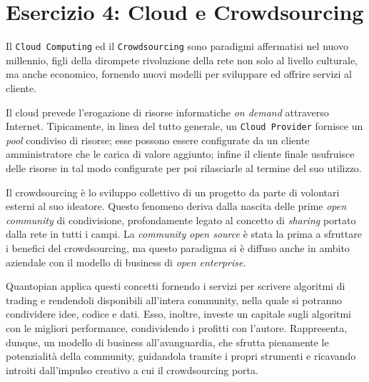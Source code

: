 		\section{Esercizio 4: Cloud e Crowdsourcing}
			\label{sec:es4}
			Il \texttt{Cloud Computing} ed il \texttt{Crowdsourcing} sono paradigmi affermatisi nel nuovo millennio, figli della dirompete rivoluzione della rete non solo al livello culturale, ma anche economico, fornendo nuovi modelli per sviluppare ed offrire servizi al cliente.\par
			Il cloud prevede l'erogazione di risorse informatiche \emph{on demand} attraverso Internet. Tipicamente, in linea del tutto generale, un \texttt{Cloud Provider} fornisce un \emph{pool} condiviso di risorse; esse possono essere configurate da un cliente amministratore che le carica di valore aggiunto; infine il cliente finale usufruisce delle risorse in tal modo configurate per poi rilasciarle al termine del suo utilizzo.\par
			Il crowdsourcing è lo sviluppo collettivo di un progetto da parte di volontari esterni al suo ideatore. Questo fenomeno deriva dalla nascita delle prime \emph{open community} di condivisione, profondamente legato al concetto di \emph{sharing} portato dalla rete  in tutti i campi. La \emph{community open source} è stata la prima a sfruttare i benefici del crowdsourcing, ma questo paradigma si è diffuso anche in ambito aziendale con il modello di business di \emph{open enterprise}.\par
			Quantopian applica questi concetti fornendo i servizi per scrivere algoritmi di trading e rendendoli disponibili all'intera community, nella quale si potranno condividere idee, codice e dati. Esso, inoltre, investe un capitale sugli algoritmi con le migliori performance, condividendo i profitti con l'autore. Rappresenta, dunque, un modello di business all'avanguardia, che sfrutta pienamente le potenzialità della community, guidandola tramite i propri strumenti e ricavando introiti dall'impulso creativo a cui il crowdsourcing porta.
